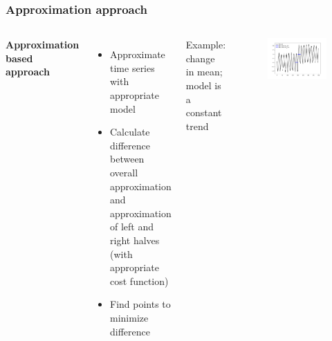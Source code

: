 \documentclass[intlimits, 9pt, unicode]{beamer}
\begin{document}
\begin{frame}
    \frametitle{Approximation approach}

  \begin{columns}[T,onlytextwidth]
      \textbf{Approximation based approach}
	    \begin{itemize}
	    	\item Approximate time series with appropriate model
		\item Calculate difference between overall approximation and approximation of left and right halves (with appropriate cost function)
		\item Find points to minimize difference
	    \end{itemize}
      Example: change in mean; model is a constant trend
      	\begin{figure}
		\includegraphics[scale=0.2]{images/approaches_second_1}
	\end{figure}
     \end{columns}

\end{frame}
\end{document}

